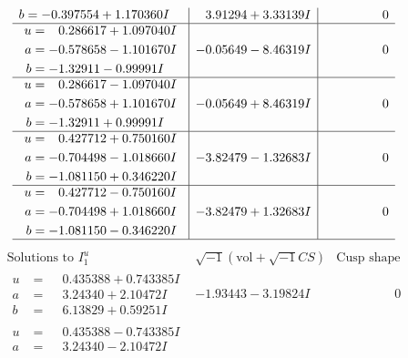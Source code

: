 \documentclass[1p]{elsarticle_modified}
\theoremstyle{definition}
\newcommand{\I}{\sqrt{-1}}
\begin{document}
$$\begin{array}{c|c|c}
\begin{aligned}
b &= -0.397554 + 1.170360 I\end{aligned}
 & \phantom{-}3.91294 + 3.33139 I & \phantom{-0.000000 } 0 \\ \hline\begin{aligned}
u &= \phantom{-}0.286617 + 1.097040 I \\
a &= -0.578658 - 1.101670 I \\
b &= -1.32911 - 0.99991 I\end{aligned}
 & -0.05649 - 8.46319 I & \phantom{-0.000000 } 0 \\ \hline\begin{aligned}
u &= \phantom{-}0.286617 - 1.097040 I \\
a &= -0.578658 + 1.101670 I \\
b &= -1.32911 + 0.99991 I\end{aligned}
 & -0.05649 + 8.46319 I & \phantom{-0.000000 } 0 \\ \hline\begin{aligned}
u &= \phantom{-}0.427712 + 0.750160 I \\
a &= -0.704498 - 1.018660 I \\
b &= -1.081150 + 0.346220 I\end{aligned}
 & -3.82479 - 1.32683 I & \phantom{-0.000000 } 0 \\ \hline\begin{aligned}
u &= \phantom{-}0.427712 - 0.750160 I \\
a &= -0.704498 + 1.018660 I \\
b &= -1.081150 - 0.346220 I\end{aligned}
 & -3.82479 + 1.32683 I & \phantom{-0.000000 } 0\\
 \hline 
 \end{array}$$\newpage$$\begin{array}{c|c|c}  
\text{Solutions to }I^u_{1}& \I (\text{vol} + \sqrt{-1}CS) & \text{Cusp shape}\\
 \hline 
\begin{aligned}
u &= \phantom{-}0.435388 + 0.743385 I \\
a &= \phantom{-}3.24340 + 2.10472 I \\
b &= \phantom{-}6.13829 + 0.59251 I\end{aligned}
 & -1.93443 - 3.19824 I & \phantom{-0.000000 } 0 \\ \hline\begin{aligned}
u &= \phantom{-}0.435388 - 0.743385 I \\
a &= \phantom{-}3.24340 - 2.10472 I \\

\end{aligned}
\end{array}$$
\end{document}
